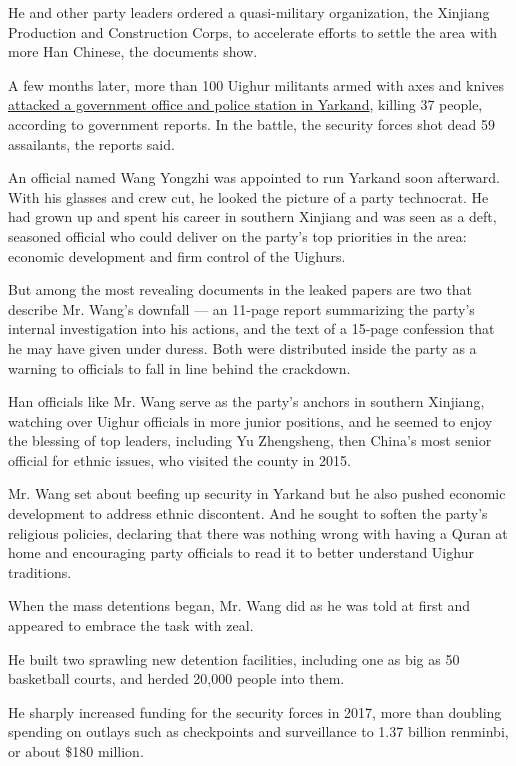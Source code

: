 He and other party leaders ordered a quasi-military organization, the
Xinjiang Production and Construction Corps, to accelerate efforts to
settle the area with more Han Chinese, the documents show.

A few months later, more than 100 Uighur militants armed with axes and
knives
\href{https://www.nytimes3xbfgragh.onion/2014/08/04/world/asia/china-says-nearly-100-are-killed-in-week-of-unrest-in-xinjiang.html}{attacked
a government office and police station in Yarkand}, killing 37 people,
according to government reports. In the battle, the security forces shot
dead 59 assailants, the reports said.

An official named Wang Yongzhi was appointed to run Yarkand soon
afterward. With his glasses and crew cut, he looked the picture of a
party technocrat. He had grown up and spent his career in southern
Xinjiang and was seen as a deft, seasoned official who could deliver on
the party's top priorities in the area: economic development and firm
control of the Uighurs.

But among the most revealing documents in the leaked papers are two that
describe Mr. Wang's downfall --- an 11-page report summarizing the
party's internal investigation into his actions, and the text of a
15-page confession that he may have given under duress. Both were
distributed inside the party as a warning to officials to fall in line
behind the crackdown.

Han officials like Mr. Wang serve as the party's anchors in southern
Xinjiang, watching over Uighur officials in more junior positions, and
he seemed to enjoy the blessing of top leaders, including Yu Zhengsheng,
then China's most senior official for ethnic issues, who visited the
county in 2015.

Mr. Wang set about beefing up security in Yarkand but he also pushed
economic development to address ethnic discontent. And he sought to
soften the party's religious policies, declaring that there was nothing
wrong with having a Quran at home and encouraging party officials to
read it to better understand Uighur traditions.

When the mass detentions began, Mr. Wang did as he was told at first and
appeared to embrace the task with zeal.

He built two sprawling new detention facilities, including one as big as
50 basketball courts, and herded 20,000 people into them.

He sharply increased funding for the security forces in 2017, more than
doubling spending on outlays such as checkpoints and surveillance to
1.37 billion renminbi, or about \$180 million.

